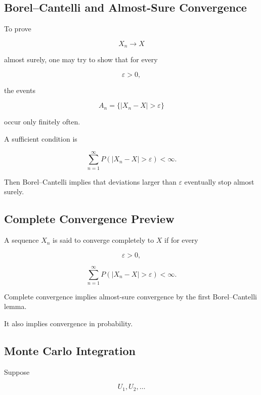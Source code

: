 \subsection{Borel--Cantelli and Almost-Sure Convergence}
\label{subsec:borel-cantelli-as-convergence}

To prove

\[
X_n\to X
\]

almost surely, one may try to show that for every

\[
\varepsilon>0,
\]

the events

\[
A_n
=
\{
|X_n-X|>\varepsilon
\}
\]

occur only finitely often.

A sufficient condition is

\[
\boxed{
\sum_{n=1}^{\infty}
P
(
|X_n-X|>\varepsilon
)
<
\infty.
}
\]

Then Borel--Cantelli implies that deviations larger than
\(\varepsilon\) eventually stop almost surely.

\subsection{Complete Convergence Preview}
\label{subsec:complete-convergence-preview}

A sequence \(X_n\) is said to converge completely to \(X\) if for every

\[
\varepsilon>0,
\]

\[
\boxed{
\sum_{n=1}^{\infty}
P(|X_n-X|>\varepsilon)
<
\infty.
}
\]

Complete convergence implies almost-sure convergence by the first
Borel--Cantelli lemma.

It also implies convergence in probability.

\subsection{Monte Carlo Integration}
\label{subsec:monte-carlo-lln}

Suppose

\[
U_1,U_2,\ldots
\]

